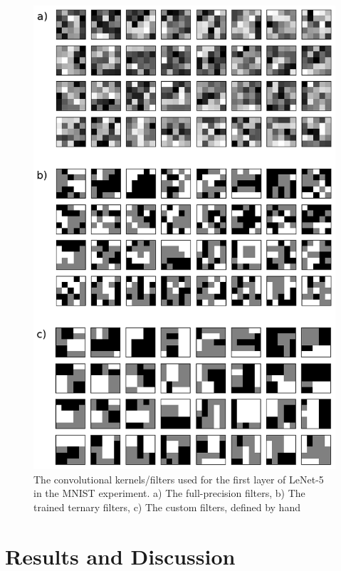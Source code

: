 \documentclass[11pt,a4paper,oldfontcommands]{memoir}
\begin{document}
\begin{figure}
    \centering
    \includegraphics[width=40em]{Methodology_Images/MNIST_Combined_Filters.png}
    \caption{
    The convolutional kernels/filters used for the first layer of LeNet-5 in the MNIST experiment. a) The full-precision filters, b) The trained ternary filters, c) The custom filters, defined by hand}
    \label{fig:mnist_combined}
\end{figure}


\chapter{Results and Discussion}
\end{document}
